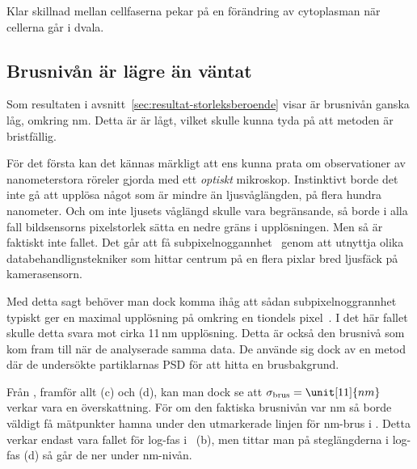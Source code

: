 Klar skillnad mellan cellfaserna pekar på en förändring av cytoplasman när cellerna går i dvala.



\subsection{Brusnivån är lägre än väntat}
Som resultaten i avsnitt~\ref{sec:resultat-storleksberoende} visar är brusnivån ganska låg, omkring \unit[5]{nm}. Detta är är lågt, vilket skulle kunna tyda på att metoden är bristfällig.

För det första kan det kännas märkligt att ens kunna prata om observationer av nanometerstora röreler gjorda med ett \emph{optiskt} mikroskop. Instinktivt borde det inte gå att upplösa något som är mindre än ljusvåglängden, på flera hundra nanometer. Och om inte ljusets våglängd skulle vara begränsande, så borde i alla fall bildsensorns pixelstorlek sätta en nedre gräns i upplösningen. Men så är faktiskt inte fallet. Det går att få subpixelnoggannhet~\cite{Saunter2010} genom att utnyttja olika databehandlignstekniker som hittar centrum på en flera pixlar bred ljusfäck på kamerasensorn.

Med detta sagt behöver man dock komma ihåg att sådan subpixelnoggrannhet typiskt ger en maximal upplösning på omkring en tiondels pixel~\cite{Saunter2010}. I det här fallet skulle detta svara mot cirka 11\,nm upplösning. Detta är också den brusnivå som \cite{Midtveldt_etal2016} kom fram till när de analyserade samma data. De använde sig dock av en metod där de undersökte partiklarnas PSD för att hitta en brusbakgrund. 

Från , framför allt (c) och (d), kan man dock se att $\sigma_\text{brus}=\unit[11]{nm}$ verkar vara en överskattning.\footnotemark{} För om den faktiska brusnivån var \unit[11]{nm} så borde väldigt få mätpunkter hamna under den utmarkerade linjen för \unit[11]{nm}-brus i . Detta verkar endast vara fallet för log-fas i ~(b), men tittar man på steglängderna i log-fas (d) så går de ner under \unit[11]{nm}-nivån.


